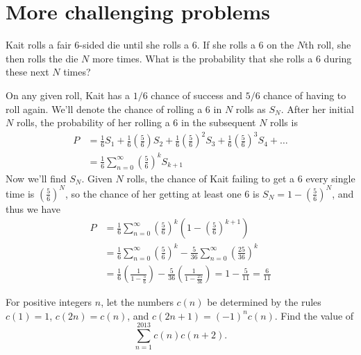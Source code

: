 \newpage
\section{More challenging problems}

\begin{problem}
    Kait rolls a fair 6-sided die until she rolls a 6. If she rolls a 6 on the $N$th roll, she then rolls the die $N$ more times. What is the probability that she rolls a 6 during these next $N$ times?
\end{problem}

\begin{solution}
    On any given roll, Kait has a $1/6$ chance of success and $5/6$ chance of having to roll again. We'll denote the chance of rolling a 6 in $N$ rolls as $S_N$. After her initial $N$ rolls, the probability of her rolling a 6 in the subsequent $N$ rolls is
    \begin{align*}
        P &= \frac{1}{6}S_1 + \frac{1}{6} \left(\frac{5}{6}\right) S_2 + \frac{1}{6} \left(\frac{5}{6}\right)^{\!\!2}S_3 + \frac{1}{6} \left(\frac{5}{6}\right)^{\!\!3}S_4 + \dots\\
        &= \frac{1}{6}\sum_{n=0}^\infty \left(\frac{5}{6}\right)^{\!\!k}S_{k+1}
    \end{align*}
    Now we'll find $S_N$. Given $N$ rolls, the chance of Kait failing to get a 6 every single time is $\left(\frac{5}{6}\right)^N$, so the chance of her getting at least one 6 is $S_N=1-\left(\frac{5}{6}\right)^N$, and thus we have
    \begin{align*}
        P &= \frac{1}{6}\sum_{n=0}^\infty \left(\frac{5}{6}\right)^{\!\!k}\left(1-\left(\frac{5}{6}\right)^{\!\!{k+1}}\right)\\
        &= \frac{1}{6}\sum_{n=0}^\infty \left(\frac{5}{6}\right)^{\!\!k} - \frac{5}{36}\sum_{n=0}^\infty \left(\frac{25}{36}\right)^{\!\!k}\\
        &= \frac{1}{6}\left(\frac{1}{1-\tfrac{5}{6}}\right) - \frac{5}{36}\left(\frac{1}{1-\tfrac{25}{36}}\right) = 1 - \frac{5}{11} = \boxed{\frac{6}{11}}
    \end{align*}
\end{solution}

\begin{problem}[A][4][Putnam 2013/B1]
    For positive integers \( n \), let the numbers \( c(n) \) be determined by the rules \( c(1) = 1 \), \( c(2n) = c(n) \), and \( c(2n+1) = (-1)^n c(n) \). Find the value of
    \[
    \sum_{n=1}^{2013} c(n)c(n+2).
    \]
\end{problem}

